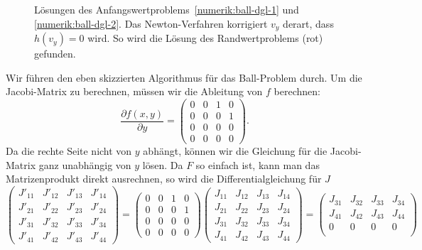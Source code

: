 \begin{beispiel}
\begin{figure}
\centering
\caption{Lösungen des Anfangswertproblems~\eqref{numerik:ball-dgl-1} und
\eqref{numerik:ball-dgl-2}.
Das Newton-Verfahren korrigiert $v_y$ derart, dass $h(v_y)=0$ wird.
So wird die Lösung des Randwertproblems (rot) gefunden.
\label{numerik:randwert-bild}}
\end{figure}
Wir führen den eben skizzierten Algorithmus für das Ball-Problem durch.
Um die Jacobi-Matrix zu berechnen, müssen wir die Ableitung von $f$ berechnen:
\begin{equation}
\frac{\partial f(x,y)}{\partial y}
=
\begin{pmatrix}
0& 0& 1& 0\\
0& 0& 0& 1\\
0& 0& 0& 0\\
0& 0& 0& 0
\end{pmatrix}.
\end{equation}
Da die rechte Seite nicht von $y$ abhängt, können wir die Gleichung für
die Jacobi-Matrix ganz unabhängig von $y$ lösen.
Da $F$ so einfach ist, kann man das Matrizenprodukt direkt ausrechnen, 
so wird die Differentialgleichung für $J$
\begin{equation}
\begin{pmatrix}
J'_{11}&J'_{12}&J'_{13}&J'_{14}\\
J'_{21}&J'_{22}&J'_{23}&J'_{24}\\
J'_{31}&J'_{32}&J'_{33}&J'_{34}\\
J'_{41}&J'_{42}&J'_{43}&J'_{44}
\end{pmatrix}
=
\begin{pmatrix}
0& 0& 1& 0\\
0& 0& 0& 1\\
0& 0& 0& 0\\
0& 0& 0& 0
\end{pmatrix}
\begin{pmatrix}
J_{11}&J_{12}&J_{13}&J_{14}\\
J_{21}&J_{22}&J_{23}&J_{24}\\
J_{31}&J_{32}&J_{33}&J_{34}\\
J_{41}&J_{42}&J_{43}&J_{44}
\end{pmatrix}
=
\begin{pmatrix}
J_{31}&J_{32}&J_{33}&J_{34}\\
J_{41}&J_{42}&J_{43}&J_{44}\\
     0&     0&     0&     0\\

\end{pmatrix}
\end{equation}
\end{beispiel}
